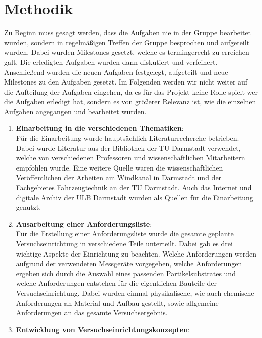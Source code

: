 \section{Methodik}
Zu Beginn muss gesagt werden, dass die Aufgaben nie in der Gruppe bearbeitet wurden, sondern in regelm\"{a}{\ss}igen Treffen der Gruppe besprochen und aufgeteilt wurden. Dabei wurden Milestones gesetzt, welche es termingerecht zu erreichen galt. Die erledigten Aufgaben wurden dann diskutiert und verfeinert. Anschlie{\ss}end wurden die neuen Aufgaben festgelegt, aufgeteilt und neue Milestones zu den Aufgaben gesetzt. Im Folgenden werden wir nicht weiter auf die Aufteilung der Aufgaben eingehen, da es für das Projekt keine Rolle spielt wer die Aufgaben erledigt hat, sondern es von gr\"{o}{\ss}erer Relevanz ist, wie die einzelnen Aufgaben angegangen und bearbeitet wurden.
\begin{enumerate}
\item \textbf{Einarbeitung in die verschiedenen Thematiken}:\\
F\"{u}r die Einarbeitung wurde haupts\"{a}chlich Literaturrecherche betrieben. Dabei wurde Literatur aus der Bibliothek der TU Darmstadt verwendet, welche von verschiedenen Professoren und wissenschaftlichen Mitarbeitern empfohlen wurde. Eine weitere Quelle waren die wissenschaftlichen Ver\"{o}ffentlichen der Arbeiten am Windkanal in Darmstadt und der Fachgebietes Fahrzeugtechnik an der TU Darmstadt. Auch das Internet und digitale Archiv der ULB Darmstadt wurden als Quellen f\"{u}r die Einarbeitung genutzt.
\item \textbf{Ausarbeitung einer Anforderungsliste}:\\
F\"{u}r die Erstellung einer Anforderungsliste wurde die gesamte geplante Versuchseinrichtung in verschiedene Teile unterteilt. Dabei gab es drei wichtige Aspekte der Einrichtung zu beachten. Welche Anforderungen werden aufgrund der verwendeten Messger\"{a}te vorgegeben, welche Anforderungen ergeben sich durch die Auswahl eines passenden Partikelsubstrates und welche Anforderungen entstehen f\"{u}r die eigentlichen Bauteile der Versuchseinrichtung. Dabei wurden einmal physikalische, wie auch chemische Anforderungen an Material und Aufbau gestellt, sowie allgemeine Anforderungen an das gesamte Versuchsergebnis.
\item \textbf{Entwicklung von Versuchseinrichtungskonzepten}:\\

\end{enumerate}
